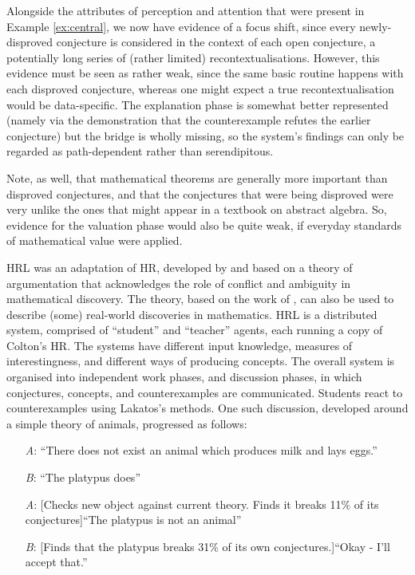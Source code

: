 Alongside the attributes of perception and attention that were present
in Example \ref{ex:central}, we now have evidence of a focus shift,
since every newly-disproved conjecture is considered in the context of
each open conjecture, a potentially long series of (rather limited)
recontextualisations.  However, this evidence must be seen as rather
weak, since the same basic routine happens with each disproved
conjecture, whereas one might expect a true recontextualisation would
be data-specific.
The explanation phase is somewhat better represented (namely via the
demonstration that the counterexample refutes the earlier conjecture)
but the bridge is wholly missing, so the system's findings can only be
regarded as path-dependent rather than serendipitous.

Note, as well, that mathematical theorems are generally more important
than disproved conjectures, and that the conjectures that were being
disproved were very unlike the ones that might appear in a textbook on
abstract algebra.  So, evidence for the valuation phase would also be
quite weak, if everyday standards of mathematical value were applied.

\begin{ex}\label{ex:platypus}
{\sf HRL} was an adaptation of {\sf HR}, developed by \citet{pease07} and 
based on a theory of argumentation that acknowledges the role of conflict and ambiguity in mathematical discovery.  The theory, based on the work of
\citet{lakatos}, can also be used to describe (some) real-world
discoveries in mathematics.  {\sf HRL} is a distributed system,
comprised of ``student'' and ``teacher'' agents, each running a copy
of Colton's {\sf HR}.  The systems have different input knowledge,
measures of interestingness, and different ways of producing concepts.
The overall system is organised into independent work phases, and
discussion phases, in which conjectures, concepts, and counterexamples
are communicated.  Students react to counterexamples using Lakatos's
methods.  One such discussion, developed around a simple theory of
animals, progressed as follows:
\begin{itemize}
\item[\emph{A}:] ``There does not exist an animal which produces milk and lays eggs.''
\item[\emph{B}:] ``The platypus does''
\item[\emph{A}:] {[}Checks new object against current theory. Finds it breaks 11\% of its conjectures{]}\newline ``The platypus is not an animal''
\item[\emph{B}:] {[}Finds that the platypus breaks 31\% of its own conjectures.{]}\newline ``Okay - I'll accept that.''
\end{itemize}
\end{ex}

